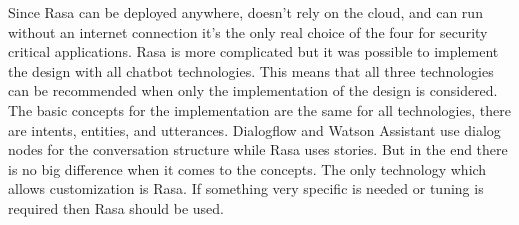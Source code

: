Since Rasa can be deployed anywhere, doesn't rely on the cloud, and can run without an
internet connection it's the only real choice of the four for security critical applications.
Rasa is more complicated but it was possible to implement the design with all chatbot technologies.
This means that all three technologies can be recommended when only the implementation of the design
is considered.
The basic concepts for the implementation are the same for all technologies, there are intents,
entities, and utterances.
Dialogflow and Watson Assistant use dialog nodes for the conversation structure while Rasa 
uses stories. 
But in the end there is no big difference when it comes to the concepts.
The only technology which allows customization is Rasa.
If something very specific is needed or tuning is required then Rasa should be used.

